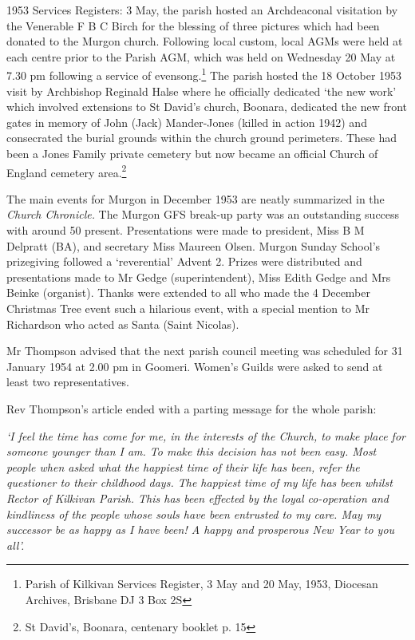 1953 Services Registers: 3 May, the parish hosted an Archdeaconal visitation by the Venerable F B C Birch for the blessing of three pictures which had been donated to the Murgon church. Following local custom, local AGMs were held at each centre prior to the Parish AGM, which was held on Wednesday 20 May at 7.30 pm following a service of evensong.\footnote{Parish of Kilkivan Services Register, 3 May and 20 May, 1953, Diocesan Archives, Brisbane DJ 3 Box 2S} The parish hosted the 18 October 1953 visit by Archbishop Reginald Halse where he officially dedicated `the new work' which involved extensions to St David's church, Boonara, dedicated the new front gates in memory of John (Jack) Mander-Jones (killed in action 1942) and consecrated the burial grounds within the church ground perimeters. These had been a Jones Family private cemetery but now became an official Church of England cemetery area.\footnote{St David's, Boonara, centenary booklet p. 15}


The main events for Murgon in December 1953 are neatly summarized in the \emph{Church Chronicle.} The Murgon GFS break-up party was an outstanding success with around 50 present. Presentations were made to president, Miss B M Delpratt (BA), and secretary Miss Maureen Olsen. Murgon Sunday School's prizegiving followed a `reverential' Advent 2. Prizes were distributed and presentations made to Mr Gedge (superintendent), Miss Edith Gedge and Mrs Beinke (organist). Thanks were extended to all who made the 4 December Christmas Tree event such a hilarious event, with a special mention to Mr Richardson who acted as Santa (Saint Nicolas).



Mr Thompson advised that the next parish council meeting was scheduled for 31 January 1954 at 2.00 pm in Goomeri. Women's Guilds were asked to send at least two representatives.



Rev Thompson's article ended with a parting message for the whole parish:



\emph{`I feel the time has come for me, in the interests of the Church, to make place for someone younger than I am. To make this decision has not been easy. Most people when asked what the happiest time of their life has been, refer the questioner to their childhood days. The happiest time of my life has been whilst Rector of Kilkivan Parish. This has been effected by the loyal co-operation and kindliness of the people whose souls have been entrusted to my care. May my successor be as happy as I have been! A happy and prosperous New Year to you all'.}



